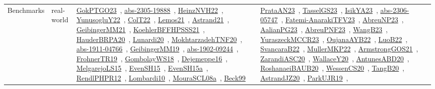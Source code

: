 {\begin{longtable}{lp{3cm}>{\raggedright\arraybackslash}p{6cm}>{\raggedright\arraybackslash}p{6cm}>{\raggedright\arraybackslash}p{8cm}}
Benchmarks & real-world & \href{../works/GokPTGO23.pdf}{GokPTGO23}~\cite{GokPTGO23}, \href{../works/abs-2305-19888.pdf}{abs-2305-19888}~\cite{abs-2305-19888}, \href{../works/HeinzNVH22.pdf}{HeinzNVH22}~\cite{HeinzNVH22}, \href{../works/YunusogluY22.pdf}{YunusogluY22}~\cite{YunusogluY22}, \href{../works/ColT22.pdf}{ColT22}~\cite{ColT22}, \href{../works/Lemos21.pdf}{Lemos21}~\cite{Lemos21}, \href{../works/Astrand21.pdf}{Astrand21}~\cite{Astrand21}, \href{../works/GeibingerMM21.pdf}{GeibingerMM21}~\cite{GeibingerMM21}, \href{../works/KoehlerBFFHPSSS21.pdf}{KoehlerBFFHPSSS21}~\cite{KoehlerBFFHPSSS21}, \href{../works/HauderBRPA20.pdf}{HauderBRPA20}~\cite{HauderBRPA20}, \href{../works/Lunardi20.pdf}{Lunardi20}~\cite{Lunardi20}, \href{../works/MokhtarzadehTNF20.pdf}{MokhtarzadehTNF20}~\cite{MokhtarzadehTNF20}, \href{../works/abs-1911-04766.pdf}{abs-1911-04766}~\cite{abs-1911-04766}, \href{../works/GeibingerMM19.pdf}{GeibingerMM19}~\cite{GeibingerMM19}, \href{../works/abs-1902-09244.pdf}{abs-1902-09244}~\cite{abs-1902-09244}, \href{../works/FrohnerTR19.pdf}{FrohnerTR19}~\cite{FrohnerTR19}, \href{../works/GombolayWS18.pdf}{GombolayWS18}~\cite{GombolayWS18}, \href{../works/Dejemeppe16.pdf}{Dejemeppe16}~\cite{Dejemeppe16}, \href{../works/MelgarejoLS15.pdf}{MelgarejoLS15}~\cite{MelgarejoLS15}, \href{../works/EvenSH15.pdf}{EvenSH15}~\cite{EvenSH15}, \href{../works/EvenSH15a.pdf}{EvenSH15a}~\cite{EvenSH15a}, \href{../works/RendlPHPR12.pdf}{RendlPHPR12}~\cite{RendlPHPR12}, \href{../works/Lombardi10.pdf}{Lombardi10}~\cite{Lombardi10}, \href{../works/MouraSCL08a.pdf}{MouraSCL08a}~\cite{MouraSCL08a}, \href{../works/Beck99.pdf}{Beck99}~\cite{Beck99} & \href{../works/PrataAN23.pdf}{PrataAN23}~\cite{PrataAN23}, \href{../works/TasselGS23.pdf}{TasselGS23}~\cite{TasselGS23}, \href{../works/IsikYA23.pdf}{IsikYA23}~\cite{IsikYA23}, \href{../works/abs-2306-05747.pdf}{abs-2306-05747}~\cite{abs-2306-05747}, \href{../works/Fatemi-AnarakiTFV23.pdf}{Fatemi-AnarakiTFV23}~\cite{Fatemi-AnarakiTFV23}, \href{../works/AbreuNP23.pdf}{AbreuNP23}~\cite{AbreuNP23}, \href{../works/AalianPG23.pdf}{AalianPG23}~\cite{AalianPG23}, \href{../works/AbreuPNF23.pdf}{AbreuPNF23}~\cite{AbreuPNF23}, \href{../works/WangB23.pdf}{WangB23}~\cite{WangB23}, \href{../works/YuraszeckMCCR23.pdf}{YuraszeckMCCR23}~\cite{YuraszeckMCCR23}, \href{../works/OujanaAYB22.pdf}{OujanaAYB22}~\cite{OujanaAYB22}, \href{../works/LuoB22.pdf}{LuoB22}~\cite{LuoB22}, \href{../works/SvancaraB22.pdf}{SvancaraB22}~\cite{SvancaraB22}, \href{../works/MullerMKP22.pdf}{MullerMKP22}~\cite{MullerMKP22}, \href{../works/ArmstrongGOS21.pdf}{ArmstrongGOS21}~\cite{ArmstrongGOS21}, \href{../works/ZarandiASC20.pdf}{ZarandiASC20}~\cite{ZarandiASC20}, \href{../works/WallaceY20.pdf}{WallaceY20}~\cite{WallaceY20}, \href{../works/AntunesABD20.pdf}{AntunesABD20}~\cite{AntunesABD20}, \href{../works/RoshanaeiBAUB20.pdf}{RoshanaeiBAUB20}~\cite{RoshanaeiBAUB20}, \href{../works/WessenCS20.pdf}{WessenCS20}~\cite{WessenCS20}, \href{../works/TangB20.pdf}{TangB20}~\cite{TangB20}, \href{../works/AstrandJZ20.pdf}{AstrandJZ20}~\cite{AstrandJZ20}, \href{../works/ParkUJR19.pdf}{ParkUJR19}~\cite{ParkUJR19}, 
\end{longtable}}
